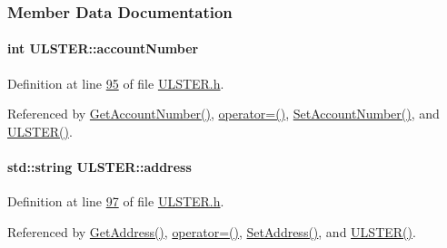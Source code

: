 \subsubsection{Member Data Documentation}
\paragraph[{\texorpdfstring{account\+Number}{accountNumber}}]{\setlength{\rightskip}{0pt plus 5cm}int U\+L\+S\+T\+E\+R\+::account\+Number\hspace{0.3cm}{\ttfamily [private]}}\hypertarget{class_u_l_s_t_e_r_a13f0c2ce30f9e66e896633d81c9af979_a13f0c2ce30f9e66e896633d81c9af979}{}\label{class_u_l_s_t_e_r_a13f0c2ce30f9e66e896633d81c9af979_a13f0c2ce30f9e66e896633d81c9af979}


Definition at line \hyperlink{_u_l_s_t_e_r_8h_source_l00095}{95} of file \hyperlink{_u_l_s_t_e_r_8h_source}{U\+L\+S\+T\+E\+R.\+h}.



Referenced by \hyperlink{_u_l_s_t_e_r_8cpp_source_l00083}{Get\+Account\+Number()}, \hyperlink{_u_l_s_t_e_r_8h_source_l00062}{operator=()}, \hyperlink{_u_l_s_t_e_r_8cpp_source_l00079}{Set\+Account\+Number()}, and \hyperlink{_u_l_s_t_e_r_8h_source_l00024}{U\+L\+S\+T\+E\+R()}.

\paragraph[{\texorpdfstring{address}{address}}]{\setlength{\rightskip}{0pt plus 5cm}std\+::string U\+L\+S\+T\+E\+R\+::address\hspace{0.3cm}{\ttfamily [private]}}\hypertarget{class_u_l_s_t_e_r_a7a13c5988ddafa47b8d6eea3e77fd786_a7a13c5988ddafa47b8d6eea3e77fd786}{}\label{class_u_l_s_t_e_r_a7a13c5988ddafa47b8d6eea3e77fd786_a7a13c5988ddafa47b8d6eea3e77fd786}


Definition at line \hyperlink{_u_l_s_t_e_r_8h_source_l00097}{97} of file \hyperlink{_u_l_s_t_e_r_8h_source}{U\+L\+S\+T\+E\+R.\+h}.



Referenced by \hyperlink{_u_l_s_t_e_r_8cpp_source_l00067}{Get\+Address()}, \hyperlink{_u_l_s_t_e_r_8h_source_l00062}{operator=()}, \hyperlink{_u_l_s_t_e_r_8cpp_source_l00063}{Set\+Address()}, and \hyperlink{_u_l_s_t_e_r_8h_source_l00024}{U\+L\+S\+T\+E\+R()}.

